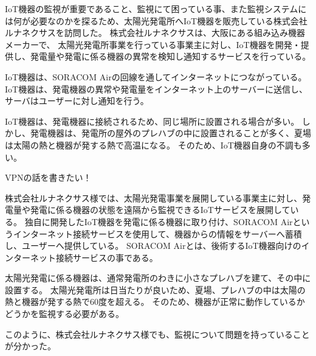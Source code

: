 
IoT機器の監視が重要であること、監視にて困っている事、また監視システムには何が必要なのかを探るため、太陽光発電所へIoT機器を販売している株式会社ルナネクサスを訪問した。
株式会社ルナネクサスは、大阪にある組み込み機器メーカーで、
太陽光発電所事業を行っている事業主に対し、IoT機器を開発・提供し、発電量や発電に係る機器の異常を検知し通知するサービスを行っている。

IoT機器は、SORACOM Airの回線を通してインターネットにつながっている。
IoT機器は、発電機器の異常や発電量をインターネット上のサーバーに送信し、サーバはユーザーに対し通知を行う。

IoT機器は、発電機器に接続されるため、同じ場所に設置される場合が多い。
しかし、発電機器は、発電所の屋外のプレハブの中に設置されることが多く、夏場は太陽の熱と機器が発する熱で高温になる。
そのため、IoT機器自身の不調も多い。


VPNの話を書きたい！








株式会社ルナネクサス様では、太陽光発電事業を展開している事業主に対し、発電量や発電に係る機器の状態を遠隔から監視できるIoTサービスを展開している。
独自に開発したIoT機器を発電に係る機器に取り付け、SORACOM Airというインターネット接続サービスを使用して、機器からの情報をサーバーへ蓄積し、ユーザーへ提供している。
SORACOM Airとは、後術するIoT機器向けのインターネット接続サービスの事である。

太陽光発電に係る機器は、通常発電所のわきに小さなプレハブを建て、その中に設置する。
太陽光発電所は日当たりが良いため、夏場、プレハブの中は太陽の熱と機器が発する熱で60度を超える。
そのため、機器が正常に動作しているかどうかを監視する必要がある。

このように、株式会社ルナネクサス様でも、監視について問題を持っていることが分かった。
